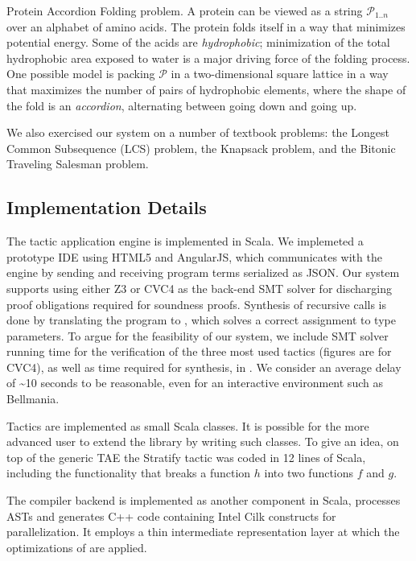 \begin{paragraph}{Protein Accordion Folding problem.} A protein can be viewed
as a string $\mathcal{P}_{1..n}$ over an alphabet of amino acids. 
The protein folds itself in a way that minimizes potential energy.
Some of the acids are {\em hydrophobic}; minimization of the total hydrophobic
area exposed to water is a major driving force of the folding process.
One possible model is packing $\mathcal{P}$ in a two-dimensional square lattice
in a way that maximizes the number of pairs of hydrophobic elements,
where the shape of the fold is an {\em accordion}, alternating between going down and going
up.
\end{paragraph}

\medskip
We also exercised our system on a number of textbook problems:
the Longest Common Subsequence (LCS) problem, the Knapsack problem,
and the Bitonic Traveling Salesman problem.

\subsection{Implementation Details}
The tactic application engine is implemented in Scala. We implemeted a prototype
IDE using HTML5 and AngularJS, which communicates with the engine by sending
and receiving program terms serialized as JSON. Our system supports using either
Z3 or CVC4 as the back-end SMT solver for discharging proof obligations required
for soundness proofs. Synthesis of recursive calls is done by translating the
program to \Sketch{}, which solves a correct assignment to type parameters.
To argue for the feasibility of our system, we include
SMT solver running time for the verification of the three most used tactics (figures are for CVC4),
as well as time required for \Sketch{} synthesis, in .
We consider an average delay of \textasciitilde 10 seconds to be reasonable, even for an interactive
environment such as Bellmania.

Tactics are implemented as small Scala classes. It is possible for
the more advanced user to extend the library by writing such classes.
To give an idea, on top of the generic TAE the {\sf Stratify} tactic was coded in 12 lines of Scala,
including the functionality that breaks a function $h$ into two functions $f$ and $g$.

The compiler backend is implemented as another component in
Scala, processes ASTs and generates C++ code containing Intel Cilk constructs for parallelization.
It employs a thin intermediate representation layer at which the optimizations of  are applied.

